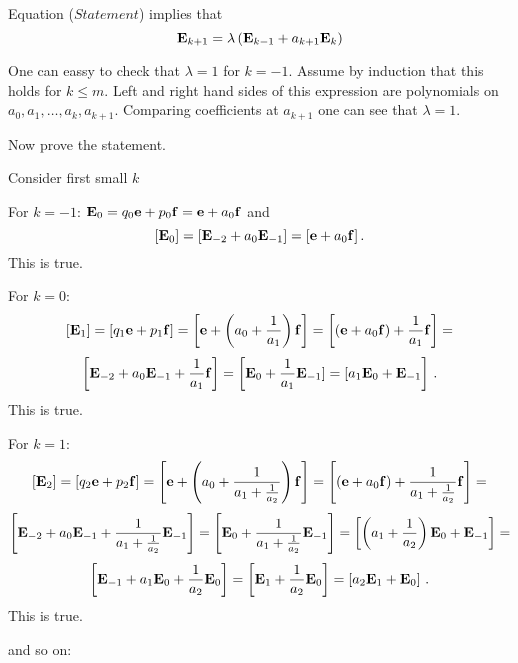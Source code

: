 Equation ($Statement$) implies that
              $$
{\bf E}_{k+1}=\lambda \left({\bf E}_{k-1}+a_{k+1}{\bf E}_k\right)
              $$

One can eassy to check that
   $\lambda =1$ for $k=-1$.
Assume by induction that this holds
for $k\leq m$.  
Left and right hand sides of this expression
are polynomials on $a_0,a_1,\dots, a_k,a_{k+1}$.
Comparing coefficients
at $a_{k+1}$ one can see that $\lambda=1$.

\medskip


Now prove the statement.


Consider first small $k$

For $k=-1$:
${\bf E}_0=q_0{\bf e}+p_0{\bf f}={\bf e}+a_0{\bf f}$ and
         $$
[{\bf E}_0]=[{\bf E}_{-2}+a_0{\bf E}_{-1}]=[{\bf e}+a_0{\bf f}]\,.
         $$
This is true.




For $k=0$:
       $$
[{\bf E}_1]=[q_1{\bf e}+p_1{\bf f}]=
\left[{\bf e}+\left(a_0+{1\over a_1}\right){\bf f}\right]=
\left[\left({\bf e}+a_0{\bf f}\right)+{1\over a_1}{\bf f}\right]=
        $$
        $$
\left[{\bf E}_{-2}+a_0{\bf E}_{-1}+{1\over a_1}{\bf f}\right]=
\left[{\bf E}_0+{1\over a_1}{\bf E}_{-1}]=[a_1{\bf E}_0+{\bf E}_{-1}\right]\,.
         $$
This is true.

\medskip

For $k=1$:
       $$
[{\bf E}_2]=[q_2{\bf e}+p_2{\bf f}]=
\left[{\bf e}+\left(a_0+{1\over a_1+{1\over a_2}}\right){\bf f}\right]=
\left[\left({\bf e}+a_0{\bf f}\right)+{1\over a_1+{1\over a_2}}{\bf f}\right]=
        $$
        $$
\left[{\bf E}_{-2}+a_0{\bf E}_{-1}+
{1\over a_1+{1\over a_2}}{\bf E}_{-1}\right]=
\left[{\bf E}_0+{1\over a_1+{1\over a_2}}{\bf E}_{-1}\right]=
\left[\left(a_1+{1\over a_2}\right){\bf E}_0+{\bf E}_{-1}\right]=
         $$
         $$
\left[{\bf E}_{-1}+a_1{\bf E}_0+{1\over a_2}{\bf E}_0\right]=
\left[{\bf E}_1+{1\over a_2}{\bf E}_0\right]=
\left[a_2{\bf E}_1+{\bf E}_0\right]\,.
         $$
This is true.

and so on:



